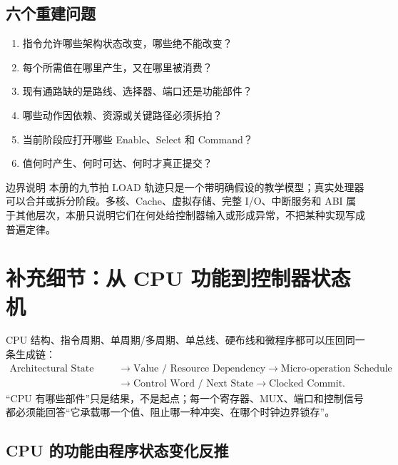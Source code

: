 \documentclass[UTF8,fontset=fandol,11pt,a4paper]{ctexart}
\begin{document}
\subsection*{六个重建问题}
\begin{enumerate}
  \item 指令允许哪些架构状态改变，哪些绝不能改变？
  \item 每个所需值在哪里产生，又在哪里被消费？
  \item 现有通路缺的是路线、选择器、端口还是功能部件？
  \item 哪些动作因依赖、资源或关键路径必须拆拍？
  \item 当前阶段应打开哪些 Enable、Select 和 Command？
  \item 值何时产生、何时可达、何时才真正提交？
\end{enumerate}

\begin{methodbox}{边界说明}
本册的九节拍 LOAD 轨迹只是一个带明确假设的教学模型；真实处理器可以合并或拆分阶段。多核、Cache、虚拟存储、完整 I/O、中断服务和 ABI 属于其他层次，本册只说明它们在何处给控制器输入或形成异常，不把某种实现写成普遍定律。
\end{methodbox}

\section{补充细节：从 CPU 功能到控制器状态机}

CPU 结构、指令周期、单周期/多周期、单总线、硬布线和微程序都可以压回同一条生成链：
\[
\begin{aligned}
\text{Architectural State Delta}&\to\text{Value / Resource Dependency}\to\text{Micro-operation Schedule}\\
&\to\text{Control Word / Next State}\to\text{Clocked Commit}.
\end{aligned}
\]
“CPU 有哪些部件”只是结果，不是起点；每一个寄存器、MUX、端口和控制信号都必须能回答“它承载哪一个值、阻止哪一种冲突、在哪个时钟边界锁存”。

\subsection{CPU 的功能由程序状态变化反推}
\end{document}
